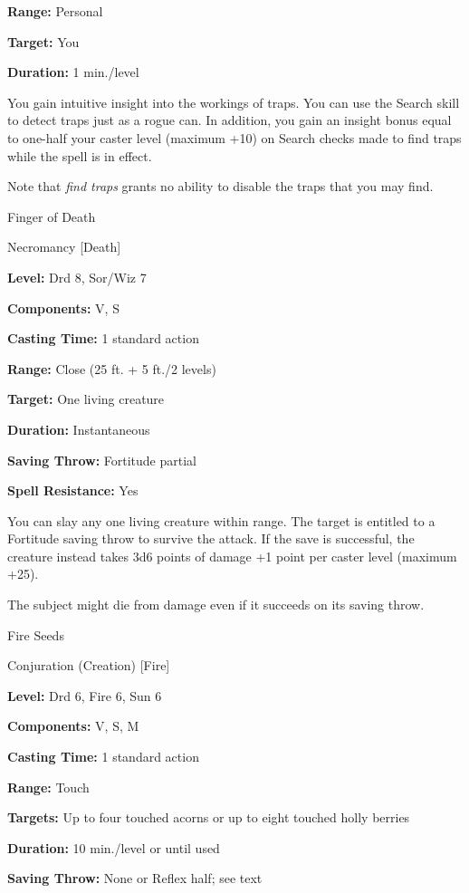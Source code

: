\documentclass{article}
\begin{document}
\textbf{Range:} Personal

\textbf{Target:} You

\textbf{Duration:} 1 min./level

You gain intuitive insight into the workings of traps. You can use the Search skill 
to detect traps just as a rogue can. In addition, you gain an insight bonus equal 
to one-half your caster level (maximum +10) on Search checks made to find traps 
while the spell is in effect.

Note that \textit{find traps }grants no ability to disable the traps that you may 
find.

\vspace{12pt}
Finger of Death

Necromancy [Death]

\textbf{Level:} Drd 8, Sor/Wiz 7

\textbf{Components:} V, S

\textbf{Casting Time:} 1 standard action

\textbf{Range:} Close (25 ft. + 5 ft./2 levels)

\textbf{Target:} One living creature

\textbf{Duration:} Instantaneous

\textbf{Saving Throw:} Fortitude partial

\textbf{Spell Resistance:} Yes

You can slay any one living creature within range. The target is entitled to a 
Fortitude saving throw to survive the attack. If the save is successful, the creature 
instead takes 3d6 points of damage +1 point per caster level (maximum +25).

The subject might die from damage even if it succeeds on its saving throw.

\vspace{12pt}
Fire Seeds

Conjuration (Creation) [Fire]

\textbf{Level:} Drd 6, Fire 6, Sun 6

\textbf{Components:} V, S, M

\textbf{Casting Time:} 1 standard action

\textbf{Range:} Touch

\textbf{Targets:} Up to four touched acorns or up to eight touched holly berries

\textbf{Duration:} 10 min./level or until used

\textbf{Saving Throw:} None or Reflex half; see text
\end{document}
